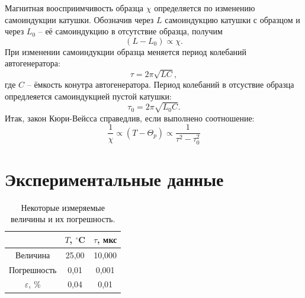 \documentclass[a4paper,12pt]{article} %
\begin{document}
	Магнитная воосприимчивость образца $\chi$ определяется по изменению самоиндукции катушки. Обозначив через $L$ самоиндукцию катушки с образцом и через $L_0$ -- её самоиндукцию в отсутствие образца, получим
	\begin{equation*}
		(L-L_0)\propto \chi.
	\end{equation*}
	При изменении самоиндукции образца меняется период колебаний автогенератора:
	\begin{equation*}
		\tau = 2\pi \sqrt{LC},
	\end{equation*}
	где $C$ -- ёмкость конутра автогенератора. Период колебаний в отсуствие образца опредлеяется самоиндукцией пустой катушки:
	\begin{equation*}
		\tau_0 = 2\pi \sqrt{L_0C}.
	\end{equation*}
	Итак, закон Кюри-Вейсса справедлив, если выполнено соотношение:
	\begin{equation}
		\frac{1}{\chi} \propto (T-\Theta_p) \propto \frac{1}{\tau^2-\tau_0^2}
	\end{equation}
	

\section{Экспериментальные данные}
	

	\begin{table}[H]
		\caption{Некоторые измеряемые величины и их погрешность.}
		\label{table:error}
		\begin{tabular}{|c|c|c|}
			\hline
			& $T$, $^\circ$C & $\tau$, мкс \\ \hline
			Величина          & 25,00          & 10,000      \\ \hline
			Погрешность       & 0,01           & 0,001       \\ \hline
			$\varepsilon$, \% & 0,04           & 0,01        \\ \hline
		\end{tabular}
	\end{table}
\end{document}
